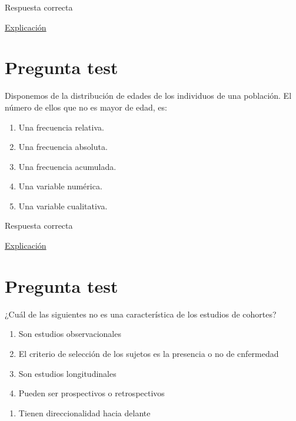 \documentclass[
]{book}
\providecommand{\tightlist}{%
  \setlength{\itemsep}{0pt}\setlength{\parskip}{0pt}}
\begin{document}
Respuesta correcta

\href{https://1fjmanzano.github.io/bioestadistica/conceptos-previos.html}{Explicación}

\hypertarget{pregunta-test-21}{%
\section{Pregunta test}\label{pregunta-test-21}}

Disponemos de la distribución de edades de los individuos de una población. El número de ellos que no es mayor de edad, es:

\begin{enumerate}
\def\labelenumi{\alph{enumi})}
\tightlist
\item
  Una frecuencia relativa.
\item
  Una frecuencia absoluta.
\item
  Una frecuencia acumulada.
\item
  Una variable numérica.
\item
  Una variable cualitativa.
\end{enumerate}

Respuesta correcta

\href{https://1fjmanzano.github.io/bioestadistica/tablas-de-frecuencias.html}{Explicación}

\hypertarget{pregunta-test-22}{%
\section{Pregunta test}\label{pregunta-test-22}}

¿Cuál de las siguientes no es una característica de los estudios de cohortes?

\begin{enumerate}
\def\labelenumi{\alph{enumi})}
\tightlist
\item
  Son estudios observacionales
\item
  El criterio de selección de los sujetos es la presencia o no de cnfermedad
\item
  Son estudios longitudinales
\item
  Pueden ser prospectivos o retrospectivos
\end{enumerate}

\begin{enumerate}
\def\labelenumi{\arabic{enumi})}
\setcounter{enumi}{4}
\tightlist
\item
  Tienen direccionalidad hacia delante
\end{enumerate}
\end{document}
